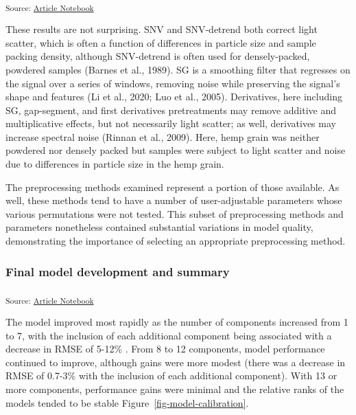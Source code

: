 \documentclass[
]{agujournal2019}
\begin{document}
\textsubscript{Source:
\href{https://rvcrawford.github.io/glowing-system/index.qmd.html}{Article
Notebook}}

These results are not surprising. SNV and SNV-detrend both correct light
scatter, which is often a function of differences in particle size and
sample packing density, although SNV-detrend is often used for
densely-packed, powdered samples (Barnes et al., 1989). SG is a
smoothing filter that regresses on the signal over a series of windows,
removing noise while preserving the signal's shape and features (Li et
al., 2020; Luo et al., 2005). Derivatives, here including SG,
gap-segment, and first derivatives pretreatments may remove additive and
multiplicative effects, but not necessarily light scatter; as well,
derivatives may increase spectral noise (Rinnan et al., 2009). Here,
hemp grain was neither powdered nor densely packed but samples were
subject to light scatter and noise due to differences in particle size
in the hemp grain.

The preprocessing methods examined represent a portion of those
available. As well, these methods tend to have a number of
user-adjustable parameters whose various permutations were not tested.
This subset of preprocessing methods and parameters nonetheless
contained substantial variations in model quality, demonstrating the
importance of selecting an appropriate preprocessing method.

\subsubsection{Final model development and
summary}\label{final-model-development-and-summary}

\textsubscript{Source:
\href{https://rvcrawford.github.io/glowing-system/index.qmd.html}{Article
Notebook}}

The model improved most rapidly as the number of components increased
from 1 to 7, with the inclusion of each additional component being
associated with a decrease in RMSE of 5-12\% . From 8 to 12 components,
model performance continued to improve, although gains were more modest
(there was a decrease in RMSE of 0.7-3\% with the inclusion of each
additional component). With 13 or more components, performance gains
were minimal and the relative ranks of the models tended to be stable
Figure~\ref{fig-model-calibration}.
\end{document}
